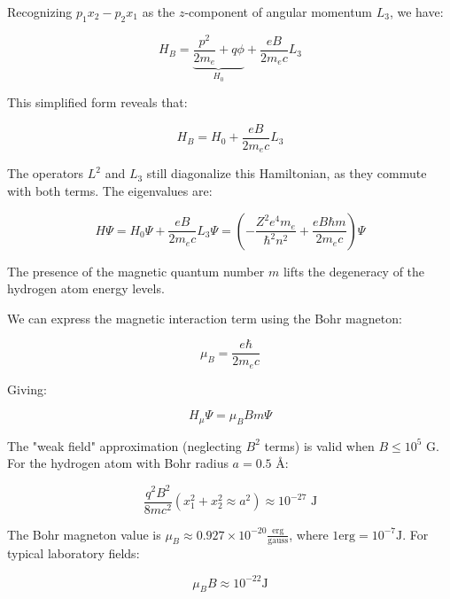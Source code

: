 \documentclass[italian]{HKNdocument}
\begin{document}
Recognizing $p_{1}x_{2}-p_{2}x_{1}$ as the $z$-component of angular momentum $L_3$, we have:

\begin{equation*}
H_{B}=\underbrace{\frac{p^{2}}{2m_e}+q\phi}_{H_0}+\frac{eB}{2m_e c}L_3 \tag{12.15}
\end{equation*}

This simplified form reveals that:

\begin{equation*}
H_{B}=H_0+\frac{eB}{2m_e c}L_3 \tag{12.16}
\end{equation*}

The operators $L^2$ and $L_3$ still diagonalize this Hamiltonian, as they commute with both terms. The eigenvalues are:

\begin{equation*}
H\Psi=H_0\Psi+\frac{eB}{2m_e c}L_3\Psi=\left(-\frac{Z^2e^4m_e}{\hbar^2n^2}+\frac{eB\hbar m}{2m_e c}\right)\Psi \tag{12.17}
\end{equation*}

The presence of the magnetic quantum number $m$ lifts the degeneracy of the hydrogen atom energy levels.

We can express the magnetic interaction term using the Bohr magneton:

\begin{equation*}
\mu_B=\frac{e\hbar}{2m_e c} \tag{12.18}
\end{equation*}

Giving:

\begin{equation*}
H_\mu\Psi=\mu_B Bm\Psi \tag{12.19}
\end{equation*}

The "weak field" approximation (neglecting $B^2$ terms) is valid when $B\leq 10^5$ G. For the hydrogen atom with Bohr radius $a=0.5$ Å:

\begin{equation*}
\frac{q^2B^2}{8mc^2}(x_1^2+x_2^2\approx a^2)\approx 10^{-27} \text{ J} \tag{12.20}
\end{equation*}


The Bohr magneton value is $\mu_{B} \approx 0.927 \times 10^{-20} \frac{\text{erg}}{\text{gauss}}$, where $1 \text{erg}=10^{-7} \text{J}$. For typical laboratory fields:

\begin{equation*}
\mu_{B}B \approx 10^{-22} \text{J} \tag{12.21}
\end{equation*}
\end{document}
